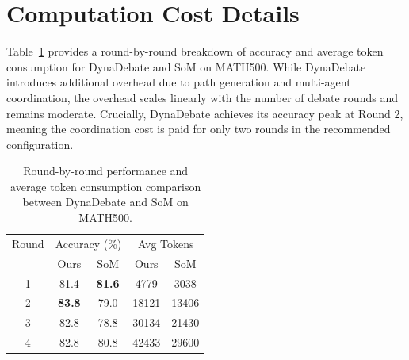 \section{Computation Cost Details}
\label{app:cost}

Table~\ref{tab:performance_token} provides a round-by-round breakdown of accuracy and average token consumption for DynaDebate and SoM on MATH500. While DynaDebate introduces additional overhead due to path generation and multi-agent coordination, the overhead scales linearly with the number of debate rounds and remains moderate. Crucially, DynaDebate achieves its accuracy peak at Round 2, meaning the coordination cost is paid for only two rounds in the recommended configuration.

\begin{table}[h]
\centering
\begin{tabular}{c|cc|cc}
\hline
Round & \multicolumn{2}{c|}{Accuracy (\%)} & \multicolumn{2}{c}{Avg Tokens} \\
      & Ours & SoM & Ours & SoM \\
\hline
1 & 81.4 & \textbf{81.6} & 4779  & 3038  \\
2 & \textbf{83.8} & 79.0 & 18121 & 13406 \\
3 & 82.8 & 78.8 & 30134 & 21430 \\
4 & 82.8 & 80.8 & 42433 & 29600 \\
\hline
\end{tabular}
\caption{Round-by-round performance and average token consumption comparison between DynaDebate and SoM on MATH500.}
\label{tab:performance_token}
\end{table}

